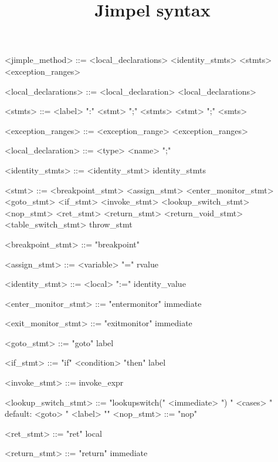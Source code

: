 \documentclass{report}
\begin{document}
\title{Jimpel syntax}

\maketitle








\begin{grammar}
<jimple_method> ::= <local_declarations> <identity_stmts> <stmts> <exception_ranges>

<local_declarations> ::= <local_declaration> <local_declarations>

<stmts> ::= <label> ":" <stmt> ";" <stmts> \alt  <stmt> ";" <smts>

<exception_ranges> ::= <exception_range> <exception_ranges>

<local_declaration> ::= <type> <name> ";"

<identity_stmts> ::= <identity_stmt> identity_stmts

<stmt> ::= <breakpoint_stmt> \alt <assign_stmt> \alt <enter_monitor_stmt>
<goto_stmt> \alt <if_stmt> \alt <invoke_stmt> \alt <lookup_switch_stmt> \alt <nop_stmt> \alt <ret_stmt> \alt <return_stmt> \alt <return_void_stmt> \alt <table_switch_stmt> \alt throw_stmt

<breakpoint_stmt> ::= "breakpoint"

<assign_stmt> ::= <variable> "=" rvalue

<identity_stmt> ::= <local> ":=" identity_value

<enter_monitor_stmt> ::= "entermonitor" immediate

<exit_monitor_stmt> ::= "exitmonitor" immediate

<goto_stmt> ::= "goto" label

<if_stmt> ::= "if" <condition> "then" label

<invoke_stmt> ::= invoke_expr

<lookup_switch_stmt> ::= "lookupswitch(" <immediate> ") {" <cases> " default: <goto> " <label> "}" <nop_stmt> ::= "nop"

<ret_stmt> ::= "ret" local

<return_stmt> ::= "return" immediate


\end{grammar}
\end{document}
